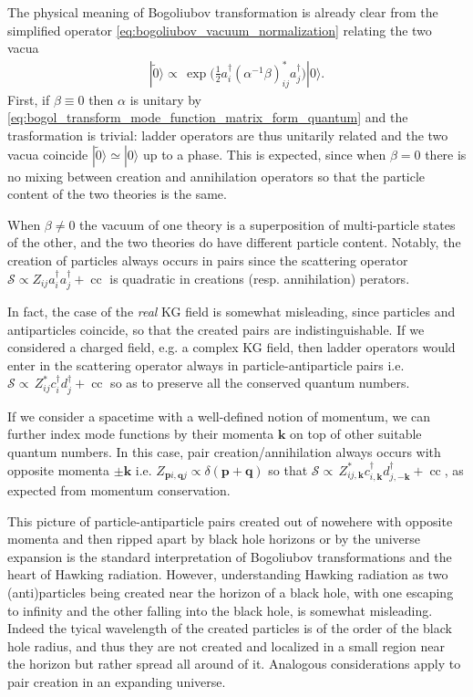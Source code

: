 \documentclass[../QFT_main.tex]{subfiles}
\begin{document}
\begin{mytheorem}
The physical meaning of Bogoliubov transformation is already clear from the simplified operator \eqref{eq:bogoliubov_vacuum_normalization} relating the two vacua
{\small\begin{align}
    |\tilde{0}\rangle \propto\, \exp\Big(\tfrac{1}{2} a^\dagger_i (\alpha^{-1}\beta)^*_{ij} a^\dagger_j\Big) |0\rangle.
\end{align}}
First, if $\beta\equiv 0$ then $\alpha$ is unitary by \eqref{eq:bogol_transform_mode_function_matrix_form_quantum} and the trasformation is trivial: ladder operators are thus unitarily related and the two vacua coincide $|\tilde{0}\rangle \simeq |0\rangle$ up to a phase.
This is expected, since when $\beta=0$ there is no mixing between creation and annihilation operators so that the particle content of the two theories is the same.

When $\beta\neq 0$ the vacuum of one theory is a superposition of multi-particle states of the other, and the two theories do have different particle content.
Notably, the creation of particles always occurs in pairs since the scattering operator $\mathcal{S}\propto Z_{ij}a_i^\dagger a_j^\dagger+\operatorname{cc}$ is quadratic in creations (resp. annihilation) perators.

In fact, the case of the \emph{real} KG field is somewhat misleading, since particles and antiparticles coincide, so that the created pairs are indistinguishable.
If we considered a charged field, e.g. a complex KG field, then ladder operators would enter in the scattering operator always in particle-antiparticle pairs i.e. $\mathcal{S}\propto\, Z_{ij}^* c_i^\dagger d_j^\dagger + \operatorname{cc}$ so as to preserve all the conserved quantum numbers.

If we consider a spacetime with a well-defined notion of momentum, we can further index mode functions by their momenta $\mathbf{k}$ on top of other suitable quantum numbers.
In this case, pair creation/annihilation always occurs with opposite momenta $\pm\mathbf{k}$ i.e. $Z_{\mathbf{p}i,\mathbf{q}j}\propto \delta(\mathbf{p}+\mathbf{q})$ so that $\mathcal{S}\propto\, Z_{ij,\mathbf{k}}^* c_{i,\mathbf{k}}^\dagger d_{j,-\mathbf{k}}^\dagger + \operatorname{cc}$, as expected from momentum conservation.

This picture of particle-antiparticle pairs created out of nowehere with opposite momenta and then ripped apart by black hole horizons or by the universe expansion is the standard interpretation of Bogoliubov transformations and the heart of Hawking radiation. 
However, understanding Hawking radiation as two (anti)particles being created near the horizon of a black hole, with one escaping to infinity and the other falling into the black hole, is somewhat misleading.
Indeed the tyical wavelength of the created particles is of the order of the black hole radius, and thus they are not created and localized in a small region near the horizon but rather spread all around of it.
Analogous considerations apply to pair creation in an expanding universe.
 

\end{mytheorem}
\end{document}
